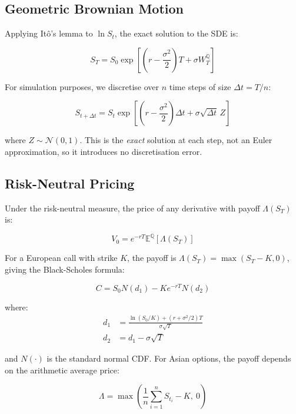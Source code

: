 \documentclass[12pt]{article}
\begin{document}
\subsection{Geometric Brownian Motion}

Applying It\^{o}'s lemma to $\ln S_t$, the exact solution to the SDE is:

\begin{equation}
    S_T = S_0 \exp\left[\left(r - \frac{\sigma^2}{2}\right)T
    + \sigma W_T^{\mathbb{Q}}\right]
\end{equation}

For simulation purposes, we discretise over $n$ time steps of size
$\Delta t = T/n$:

\begin{equation}
    S_{t + \Delta t} = S_t \exp\left[\left(r - \frac{\sigma^2}{2}\right)
    \Delta t + \sigma \sqrt{\Delta t} \, Z\right]
\end{equation}

where $Z \sim \mathcal{N}(0, 1)$. This is the \textit{exact} solution at
each step, not an Euler approximation, so it introduces no discretisation
error.

\subsection{Risk-Neutral Pricing}

Under the risk-neutral measure, the price of any derivative with payoff
$\Lambda(S_T)$ is:

\begin{equation}
    V_0 = e^{-rT} \mathbb{E}^{\mathbb{Q}}[\Lambda(S_T)]
\end{equation}

For a European call with strike $K$, the payoff is
$\Lambda(S_T) = \max(S_T - K, 0)$, giving the Black-Scholes formula:

\begin{equation}
    C = S_0 N(d_1) - K e^{-rT} N(d_2)
\end{equation}

where:
\begin{align}
    d_1 &= \frac{\ln(S_0/K) + (r + \sigma^2/2)T}{\sigma\sqrt{T}} \\
    d_2 &= d_1 - \sigma\sqrt{T}
\end{align}

and $N(\cdot)$ is the standard normal CDF. For Asian options, the payoff
depends on the arithmetic average price:

\begin{equation}
    \Lambda = \max\left(\frac{1}{n}\sum_{i=1}^{n} S_{t_i} - K,\ 0\right)
\end{equation}
\end{document}

